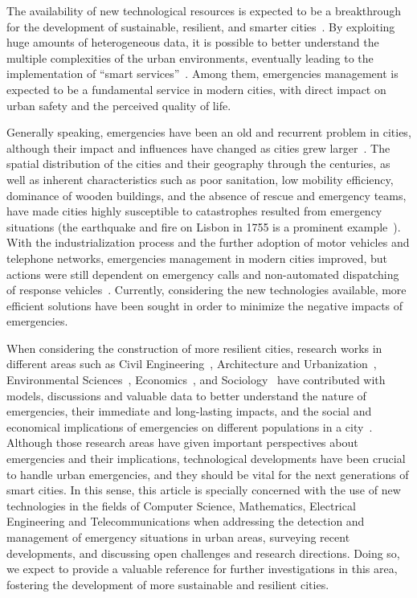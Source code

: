 \begin{refsection}
The availability of new technological resources is expected to be a breakthrough for the development of sustainable, resilient, and smarter cities~\cite{smartcities4}. By exploiting huge amounts of heterogeneous data, it is possible to better understand the multiple complexities of the urban environments, eventually leading to the implementation of ``smart services''~\cite{citiesvehicles,citiesdata,twitterDetection2}. Among them, emergencies management is expected to be a fundamental service in modern cities, with direct impact on urban safety and the perceived quality of life.

Generally speaking, emergencies have been an old and recurrent problem in cities, although their impact and influences have changed as cities grew larger~\cite{emergenciesmetric1}. The spatial distribution of the cities and their geography through the centuries, as well as inherent characteristics such as poor sanitation, low mobility efficiency, dominance of wooden buildings, and the absence of rescue and emergency teams, have made cities highly susceptible to catastrophes resulted from emergency situations (the earthquake and fire on Lisbon in 1755 is a prominent example~\cite{lisbon}). With the industrialization process and the further adoption of motor vehicles and telephone networks, emergencies management in modern cities improved, but actions were still dependent on emergency calls and non-automated dispatching of response vehicles~\cite{fireevolution}. Currently, considering the new technologies available, more efficient solutions have been sought in order to minimize the negative impacts of emergencies.

When considering the construction of more resilient cities, research works in different areas such as Civil Engineering~\cite{civilengineering1,civilengineering2}, Architecture and Urbanization~\cite{architecture1,architecture2}, Environmental Sciences~\cite{enviroment1,enviroment2}, Economics~\cite{economics1,economics2}, and Sociology~\cite{sociology1,sociology2} have contributed with models, discussions and valuable data to better understand the nature of emergencies, their immediate and long-lasting impacts, and the social and economical implications of emergencies on different populations in a city~\cite{emergenciesmetric1,citiesemergencies1}. Although those research areas have given important perspectives about emergencies and their implications, technological developments have been crucial to handle urban emergencies, and they should be vital for the next generations of smart cities. In this sense, this article is specially concerned with the use of new technologies in the fields of Computer Science, Mathematics, Electrical Engineering and Telecommunications when addressing the detection and management of emergency situations in urban areas, surveying recent developments, and discussing open challenges and research directions. Doing so, we expect to provide a valuable reference for further investigations in this area, fostering the development of more sustainable and resilient cities. 


\end{refsection}

